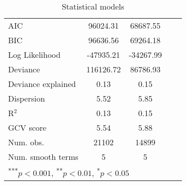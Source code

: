 \begin{table}
\begin{center}
\begin{tabular}{l c c c c}
\hline
AIC                & 96024.31                 & 68687.55                 \\
BIC                & 96636.56                 & 69264.18                 \\
Log Likelihood     & -47935.21                & -34267.99                \\
Deviance           & 116126.72                & 86786.93                 \\
Deviance explained & 0.13                     & 0.15                     \\
Dispersion         & 5.52                     & 5.85                     \\
R$^2$              & 0.13                     & 0.15                     \\
GCV score          & 5.54                     & 5.88                     \\
Num. obs.          & 21102                    & 14899                    \\
Num. smooth terms  & 5                        & 5                        \\
\hline
\multicolumn{3}{l}{\scriptsize{\textsuperscript{***}$p<0.001$, 
\textsuperscript{**}$p<0.01$, 
\textsuperscript{*}$p<0.05$}}
\end{tabular}
\caption{Statistical models}
\label{table:coefficients}
\end{center}
\end{table}